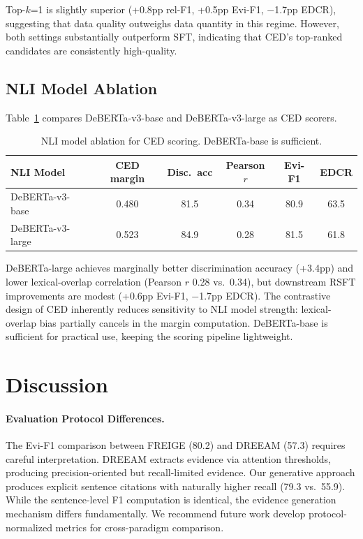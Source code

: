 \documentclass[11pt,a4paper]{article}
\newcommand{\method}{FREIGE}
\begin{document}
Top-$k$=1 is slightly superior (+0.8pp rel-F1, +0.5pp Evi-F1, $-$1.7pp EDCR), suggesting that data quality outweighs data quantity in this regime. However, both settings substantially outperform SFT, indicating that CED's top-ranked candidates are consistently high-quality.

\subsection{NLI Model Ablation}

Table~\ref{tab:nli_ablation} compares DeBERTa-v3-base and DeBERTa-v3-large as CED scorers.

\begin{table}[h]
\centering
\caption{NLI model ablation for CED scoring. DeBERTa-base is sufficient.}
\label{tab:nli_ablation}
\begin{tabular}{lccccc}
\toprule
\textbf{NLI Model} & \textbf{CED margin} & \textbf{Disc.\ acc} & \textbf{Pearson $r$} & \textbf{Evi-F1} & \textbf{EDCR} \\
\midrule
DeBERTa-v3-base & 0.480 & 81.5 & 0.34 & 80.9 & 63.5 \\
DeBERTa-v3-large & 0.523 & 84.9 & 0.28 & 81.5 & 61.8 \\
\bottomrule
\end{tabular}
\end{table}

DeBERTa-large achieves marginally better discrimination accuracy (+3.4pp) and lower lexical-overlap correlation (Pearson $r$ 0.28 vs.\ 0.34), but downstream RSFT improvements are modest (+0.6pp Evi-F1, $-$1.7pp EDCR). The contrastive design of CED inherently reduces sensitivity to NLI model strength: lexical-overlap bias partially cancels in the margin computation. DeBERTa-base is sufficient for practical use, keeping the scoring pipeline lightweight.

\section{Discussion}

\paragraph{Evaluation Protocol Differences.}
The Evi-F1 comparison between \method{} (80.2) and DREEAM (57.3) requires careful interpretation. DREEAM extracts evidence via attention thresholds, producing precision-oriented but recall-limited evidence. Our generative approach produces explicit sentence citations with naturally higher recall (79.3 vs.\ 55.9). While the sentence-level F1 computation is identical, the evidence generation mechanism differs fundamentally. We recommend future work develop protocol-normalized metrics for cross-paradigm comparison.
\end{document}
